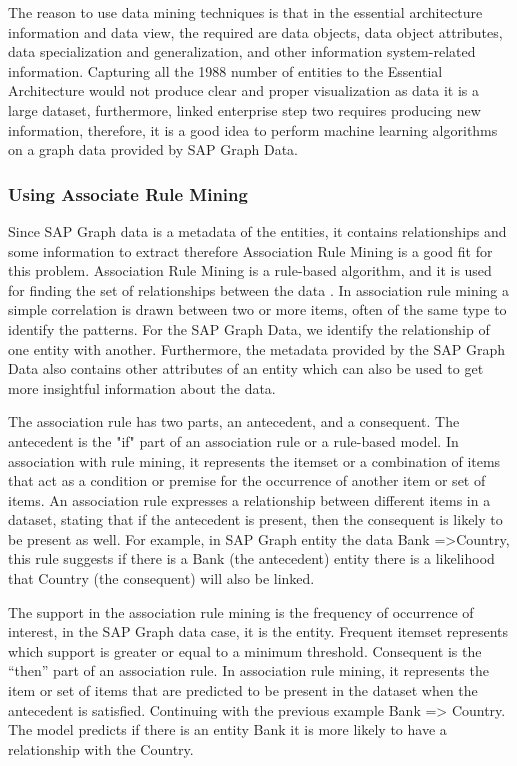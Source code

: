 \documentclass{article}
\begin{document}
The reason to use data mining techniques is that in the essential architecture information and data view, the required are data objects, data object attributes, data specialization and generalization, and other information system-related information. Capturing all the 1988 number of entities to the Essential Architecture would not produce clear and proper visualization as data it is a large dataset, furthermore, linked enterprise step two requires producing new information, therefore, it is a good idea to perform machine learning algorithms on a graph data provided by SAP Graph Data.

\maketitle
\subsubsection{Using Associate Rule Mining}

Since SAP Graph data is a metadata of the entities, it contains relationships and some information to extract therefore Association Rule Mining is a good fit for this problem. Association Rule Mining is a rule-based algorithm, and it is used for finding the set of relationships between the data \parencite{kumbhare2014}. In association rule mining a simple correlation is drawn between two or more items, often of the same type to identify the patterns. For the SAP Graph Data, we identify the relationship of one entity with another. Furthermore, the metadata provided by the SAP Graph Data also contains other attributes of an entity which can also be used to get more insightful information about the data.

The association rule has two parts, an antecedent, and a consequent. The antecedent is the "if" part of an association rule or a rule-based model. In association with rule mining, it represents the itemset or a combination of items that act as a condition or premise for the occurrence of another item or set of items. An association rule expresses a relationship between different items in a dataset, stating that if the antecedent is present, then the consequent is likely to be present as well. For example, in SAP Graph entity the data {Bank} =>{Country}, this rule suggests if there is a Bank (the antecedent) entity there is a likelihood that Country (the consequent) will also be linked.

The support in the association rule mining is the frequency of occurrence of interest, in the SAP Graph data case, it is the entity. Frequent itemset represents which support is greater or equal to a minimum threshold. Consequent is the “then” part of an association rule. In association rule mining, it represents the item or set of items that are predicted to be present in the dataset when the antecedent is satisfied. Continuing with the previous example {Bank} => {Country}. The model predicts if there is an entity Bank it is more likely to have a relationship with the Country.
\end{document}
